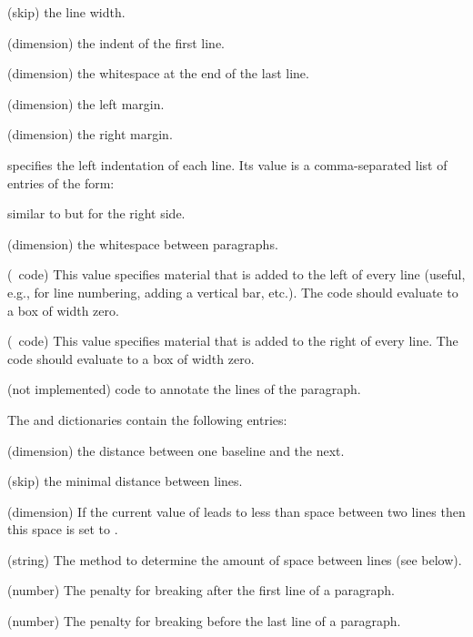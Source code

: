 \begin{longdescription}
\item{\quad (skip)}
  the line width.
\item{\quad (dimension)}
  the indent of the first line.
\item{\quad (dimension)}
  the whitespace at the end of the last line.
\item{\quad (dimension)}
  the left margin.
\item{\quad (dimension)}
  the right margin.
\item{}
  specifies the left indentation of each line. Its value is a comma-separated list
  of entries of the form\?:
\item{}
  similar to  but for the right side.
\item{\quad (dimension)}
  the whitespace between paragraphs.
\item{\quad (\ant\ code)}
  This value specifies material that is added to the left of every line
  (useful, e.g., for line numbering, adding a vertical bar, etc.).
  The code should evaluate to a box of width zero.
\item{\quad (\ant\ code)}
  This value specifies material that is added to the right of every line.
  The code should evaluate to a box of width zero.
\item{\quad (not implemented)}
  code to annotate the lines of the paragraph.
\end{longdescription}
The  and  dictionaries contain the following entries\?:
\begin{longdescription}
\item{\quad (dimension)}
  the distance between one baseline and the next.
\item{\quad (skip)}
  the minimal distance between lines.
\item{\quad (dimension)}
  If the current value of  leads
  to less than  space between two lines
  then this space is set to .
\item{\quad (string)}
  The method to determine the amount of space between lines (see below).
\item{\quad (number)}
  The penalty for breaking after the first line of a paragraph.
\item{\quad (number)}
  The penalty for breaking before the last line of a paragraph.
\end{longdescription}
